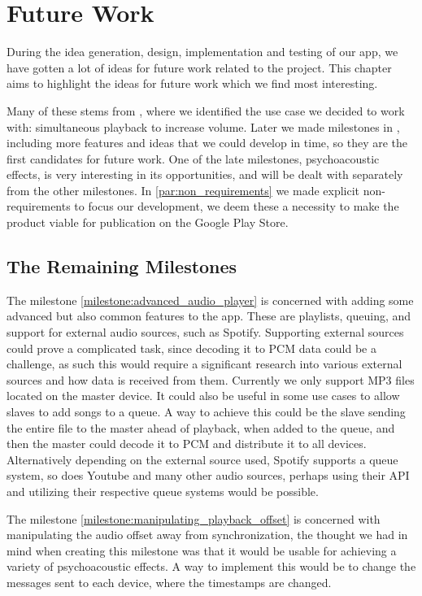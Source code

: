 \chapter{Future Work}\label{cha:future_work}
During the idea generation, design, implementation and testing of our app, we have gotten a lot of ideas for future work related to the project.
This chapter aims to highlight the ideas for future work which we find most interesting.

Many of these stems from , where we identified the use case we decided to work with: simultaneous playback to increase volume.
Later we made milestones in , including more features and ideas that we could develop in time, so they are the first candidates for future work.
One of the late milestones, psychoacoustic effects, is very interesting in its opportunities, and will be dealt with separately from the other milestones.
In \cref{par:non_requirements} we made explicit non-requirements to focus our development, we deem these a necessity to make the product viable for publication on the Google Play Store.

\section{The Remaining Milestones}
The milestone \ref{milestone:advanced_audio_player} is concerned with adding some advanced but also common features to the app.
These are playlists, queuing, and support for external audio sources, such as Spotify.
Supporting external sources could prove a complicated task, since decoding it to PCM data could be a challenge, as such this would require a significant research into various external sources and how data is received from them.
Currently we only support MP3 files located on the master device.
It could also be useful in some use cases to allow slaves to add songs to a queue.
A way to achieve this could be the slave sending the entire file to the master ahead of playback, when added to the queue, and then the master could decode it to PCM and distribute it to all devices.
Alternatively depending on the external source used, Spotify supports a queue system, so does Youtube and many other audio sources, perhaps using their API and utilizing their respective queue systems would be possible.

The milestone \ref{milestone:manipulating_playback_offset} is concerned with manipulating the audio offset away from synchronization, the thought we had in mind when creating this milestone was that it would be usable for achieving a variety of psychoacoustic effects.
A way to implement this would be to change the  messages sent to each device, where the timestamps are changed.

